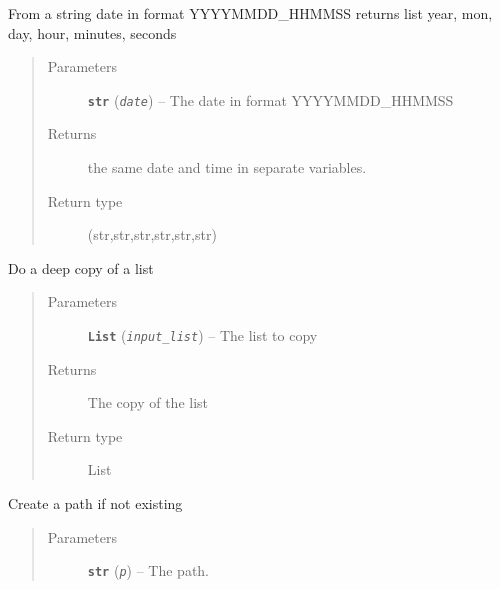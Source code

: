 \documentclass[a4paper,10pt,english]{sphinxmanual}
\begin{document}
\begin{fulllineitems}
\label{commands/apidoc/src:src.utilsSat.date_to_datetime}
From a string date in format YYYYMMDD\_HHMMSS
returns list year, mon, day, hour, minutes, seconds
\begin{quote}\begin{description}
\item[{Parameters}] \leavevmode
\textbf{\texttt{str}} (\emph{\texttt{date}}) -- The date in format YYYYMMDD\_HHMMSS

\item[{Returns}] \leavevmode
the same date and time in separate variables.

\item[{Return type}] \leavevmode
(str,str,str,str,str,str)

\end{description}\end{quote}

\end{fulllineitems}


\begin{fulllineitems}
\label{commands/apidoc/src:src.utilsSat.deepcopy_list}
Do a deep copy of a list
\begin{quote}\begin{description}
\item[{Parameters}] \leavevmode
\textbf{\texttt{List}} (\emph{\texttt{input\_list}}) -- The list to copy

\item[{Returns}] \leavevmode
The copy of the list

\item[{Return type}] \leavevmode
List

\end{description}\end{quote}

\end{fulllineitems}


\begin{fulllineitems}
\label{commands/apidoc/src:src.utilsSat.ensure_path_exists}
Create a path if not existing
\begin{quote}\begin{description}
\item[{Parameters}] \leavevmode
\textbf{\texttt{str}} (\emph{\texttt{p}}) -- The path.

\end{description}\end{quote}

\end{fulllineitems}
\end{document}
